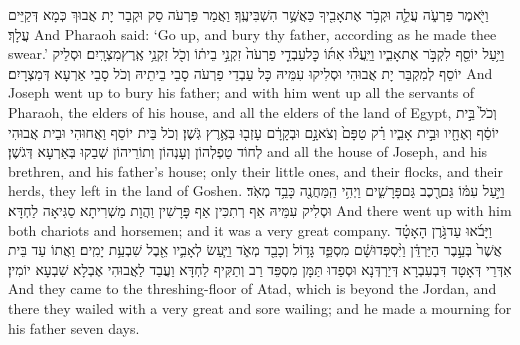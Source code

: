 {וַיֹּ֖אמֶר פַּרְעֹ֑ה עֲלֵ֛ה וּקְבֹ֥ר אֶת\maqqaf אָבִ֖יךָ כַּאֲשֶׁ֥ר הִשְׁבִּיעֶֽךָ׃}
{וַאֲמַר פַּרְעֹה סַק וּקְבַר יָת אֲבוּךְ כְּמָא דְּקַיֵּים עֲלָךְ׃}
{And Pharaoh said: ‘Go up, and bury thy father, according as he made thee swear.’}{}
{וַיַּ֥עַל יוֹסֵ֖ף לִקְבֹּ֣ר אֶת\maqqaf אָבִ֑יו וַיַּֽעֲל֨וּ אִתּ֜וֹ כׇּל\maqqaf עַבְדֵ֤י פַרְעֹה֙ זִקְנֵ֣י בֵית֔וֹ וְכֹ֖ל זִקְנֵ֥י אֶֽרֶץ\maqqaf מִצְרָֽיִם׃}
{וּסְלֵיק יוֹסֵף לְמִקְבַּר יָת אֲבוּהִי וּסְלִיקוּ עִמֵּיהּ כָּל עַבְדֵי פַרְעֹה סָבֵי בֵיתֵיהּ וְכֹל סָבֵי אַרְעָא דְּמִצְרָיִם׃}
{And Joseph went up to bury his father; and with him went up all the servants of Pharaoh, the elders of his house, and all the elders of the land of Egypt,}{}
{וְכֹל֙ בֵּ֣ית יוֹסֵ֔ף וְאֶחָ֖יו וּבֵ֣ית אָבִ֑יו רַ֗ק טַפָּם֙ וְצֹאנָ֣ם וּבְקָרָ֔ם עָזְב֖וּ בְּאֶ֥רֶץ גֹּֽשֶׁן׃}
{וְכֹל בֵּית יוֹסֵף וַאֲחוּהִי וּבֵית אֲבוּהִי לְחוֹד טַפְלְהוֹן וְעָנְהוֹן וְתוֹרֵיהוֹן שְׁבַקוּ בְּאַרְעָא דְּגֹשֶׁן׃}
{and all the house of Joseph, and his brethren, and his father’s house; only their little ones, and their flocks, and their herds, they left in the land of Goshen.}{}
{וַיַּ֣עַל עִמּ֔וֹ גַּם\maqqaf רֶ֖כֶב גַּם\maqqaf פָּרָשִׁ֑ים וַיְהִ֥י הַֽמַּחֲנֶ֖ה כָּבֵ֥ד מְאֹֽד׃}
{וּסְלִיק עִמֵּיהּ אַף רְתִכִּין אַף פָּרָשִׁין וַהֲוָת מַשְׁרִיתָא סַגִּיאָה לַחְדָּא׃}
{And there went up with him both chariots and horsemen; and it was a very great company.}{}
{וַיָּבֹ֜אוּ עַד\maqqaf גֹּ֣רֶן הָאָטָ֗ד אֲשֶׁר֙ בְּעֵ֣בֶר הַיַּרְדֵּ֔ן וַיִּ֨סְפְּדוּ\maqqaf שָׁ֔ם מִסְפֵּ֛ד גָּד֥וֹל וְכָבֵ֖ד מְאֹ֑ד וַיַּ֧עַשׂ לְאָבִ֛יו אֵ֖בֶל שִׁבְעַ֥ת יָמִֽים׃}
{וַאֲתוֹ עַד בֵּית אִדְּרֵי דְּאָטָד דִּבְעִבְרָא דְּיַרְדְּנָא וּסְפַדוּ תַּמָּן מִסְפֵּד רַב וְתַקִּיף לַחְדָּא וַעֲבַד לַאֲבוּהִי אֶבְלָא שִׁבְעָא יוֹמִין׃}
{And they came to the threshing-floor of Atad, which is beyond the Jordan, and there they wailed with a very great and sore wailing; and he made a mourning for his father seven days.}{}
